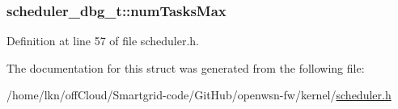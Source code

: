 \subsubsection[{\texorpdfstring{num\+Tasks\+Max}{numTasksMax}}]{ scheduler\+\_\+dbg\+\_\+t\+::num\+Tasks\+Max}\hypertarget{structscheduler__dbg__t_a0f0d97e97b02be4a75e328d4d9bdeb45}{}\label{structscheduler__dbg__t_a0f0d97e97b02be4a75e328d4d9bdeb45}


Definition at line 57 of file scheduler.\+h.



The documentation for this struct was generated from the following file\+:\begin{DoxyCompactItemize}
\item 
/home/lkn/off\+Cloud/\+Smartgrid-\/code/\+Git\+Hub/openwsn-\/fw/kernel/\hyperlink{scheduler_8h}{scheduler.\+h}\end{DoxyCompactItemize}
